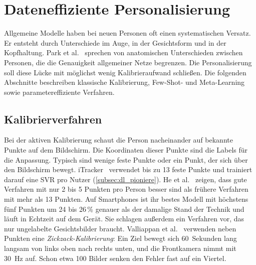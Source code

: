 \section{Dateneffiziente Personalisierung}
\label{sec:personalisierung}
Allgemeine Modelle haben bei neuen Personen oft einen systematischen Versatz.
Er entsteht durch Unterschiede im Auge, in der Gesichtsform und in der
Kopfhaltung. Park et al.~\cite{park2019faze} sprechen von anatomischen
Unterschieden zwischen Personen, die die Genauigkeit allgemeiner Netze
begrenzen. Die Personalisierung soll diese Lücke mit möglichst wenig
Kalibrieraufwand schließen. Die folgenden Abschnitte beschreiben klassische
Kalibrierung, Few-Shot- und Meta-Learning sowie parametereffiziente Verfahren.

\subsection{Kalibrierverfahren}
\label{subsec:kalibrierung}
Bei der aktiven Kalibrierung schaut die Person nacheinander auf bekannte
Punkte auf dem Bildschirm. Die Koordinaten dieser Punkte sind die Labels für
die Anpassung. Typisch sind wenige feste Punkte oder ein Punkt, der sich über
den Bildschirm bewegt. iTracker~\cite{krafka2016itracker} verwendet bis zu 13
feste Punkte und trainiert darauf eine SVR pro Nutzer
(\cref{subsec:dl_pioniere}). He et al.~\cite{he2019ondevice} zeigen, dass
gute Verfahren mit nur 2 bis 5 Punkten pro Person besser sind als frühere
Verfahren mit mehr als 13 Punkten. Auf Smartphones ist ihr bestes Modell mit
höchstens fünf Punkten um 24 bis 26\,\% genauer als der damalige Stand der
Technik und läuft in Echtzeit auf dem Gerät. Sie schlagen außerdem ein
Verfahren vor, das nur ungelabelte Gesichtsbilder braucht. Valliappan et
al.~\cite{valliappan2020smartphone} verwenden neben Punkten eine
\emph{Zickzack-Kalibrierung}: Ein Ziel bewegt sich 60~Sekunden lang langsam
von links oben nach rechts unten, und die Frontkamera nimmt mit
\SI{30}{\hertz} auf. Schon etwa 100 Bilder senken den Fehler fast auf ein
Viertel.

